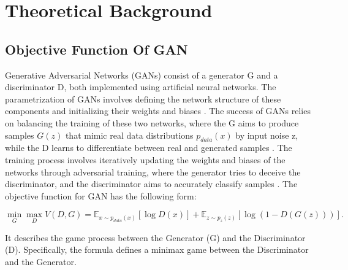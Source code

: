 \chapter{Theoretical Background}
\label{Theoretical Background for GAN}

\section{Objective Function Of GAN}

Generative Adversarial Networks (GANs) consist of a generator G and a discriminator D, 
both implemented using artificial neural networks. The parametrization of GANs involves 
defining the network structure of these components and initializing their weights and biases \citep{10.1007/s10928-021-09787-4}. 
The success of GANs relies on balancing the training of these two networks, where the 
G aims to produce samples $G(z)$ that mimic real data distributions $p_{data}(x)$ by input noise z, while the D 
learns to differentiate between real and generated samples \citep{10.1109/taslp.2017.2761547}. 
The training process involves iteratively updating the weights and biases of the networks through 
adversarial training, where the generator tries to deceive the discriminator, and the discriminator 
aims to accurately classify samples \citep{10.48550/arxiv.1802.05637}.
The objective function for GAN has the following form:

\begin{equation}
    \label{eq:min & max}
    \min_{G} \max_{D} V(D, G) = \mathbb{E}_{x \sim p_{data}(x)} [\log D(x)] + \mathbb{E}_{z \sim p_{z}(z)} [\log(1 - D(G(z)))].
\end{equation}



It describes the game process between the Generator (G) and the Discriminator (D). Specifically, 
the formula defines a minimax game between the Discriminator and the Generator.


